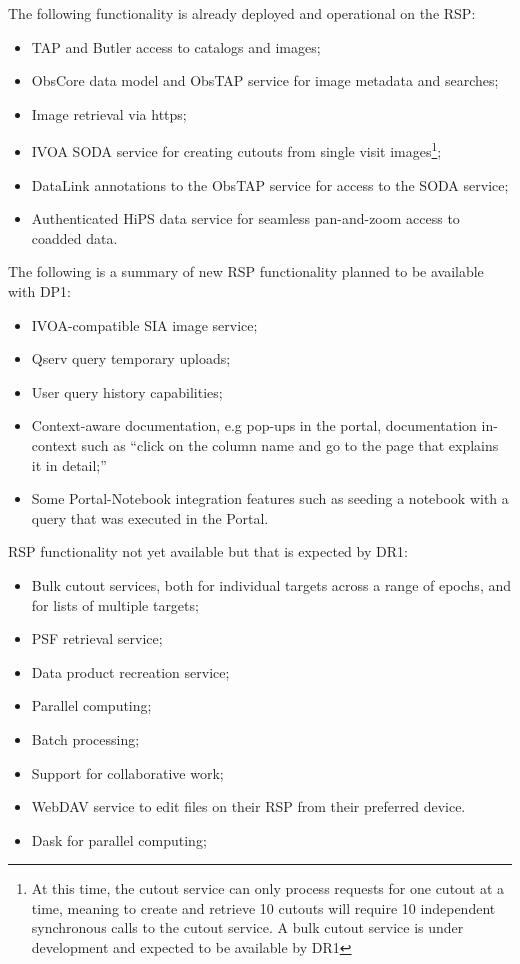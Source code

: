 The following functionality is already deployed and operational on the RSP:
\begin{itemize}
\item TAP and Butler access to catalogs and images;
\item ObsCore data model and ObsTAP service for image metadata and searches;
\item Image retrieval via https;
\item IVOA SODA service for creating cutouts from single visit images\footnote{At this time, the cutout service can only process requests for one cutout at a time, meaning to create and retrieve 10 cutouts will require 10 independent synchronous calls to the cutout service. A bulk cutout service is under development and expected to be available by DR1};
\item DataLink annotations to the ObsTAP service for access to the SODA service;
\item Authenticated HiPS data service for seamless pan-and-zoom access to coadded data.
\end{itemize}

The following is a summary of new RSP functionality planned to be available with  DP1: 
\begin{itemize}
\item IVOA-compatible SIA image service;
\item Qserv query temporary uploads;
\item User query history capabilities;
\item Context-aware documentation, e.g pop-ups in the portal, documentation in-context such as  ``click on the column name and go to the page that explains it in detail;''
\item Some Portal-Notebook integration features such as  seeding a notebook with a query that was executed in the Portal. 
\end{itemize}

RSP functionality not yet available but that is expected by DR1:
\begin{itemize}
\item Bulk cutout services, both for individual targets across a range of epochs, and for lists of multiple targets;
\item PSF retrieval service;
\item Data product recreation service; 
\item Parallel computing;
\item Batch processing; 
\item Support for collaborative work;
\item WebDAV service to edit files on their RSP from their preferred device. 
\item Dask for parallel computing;
\end{itemize} 


